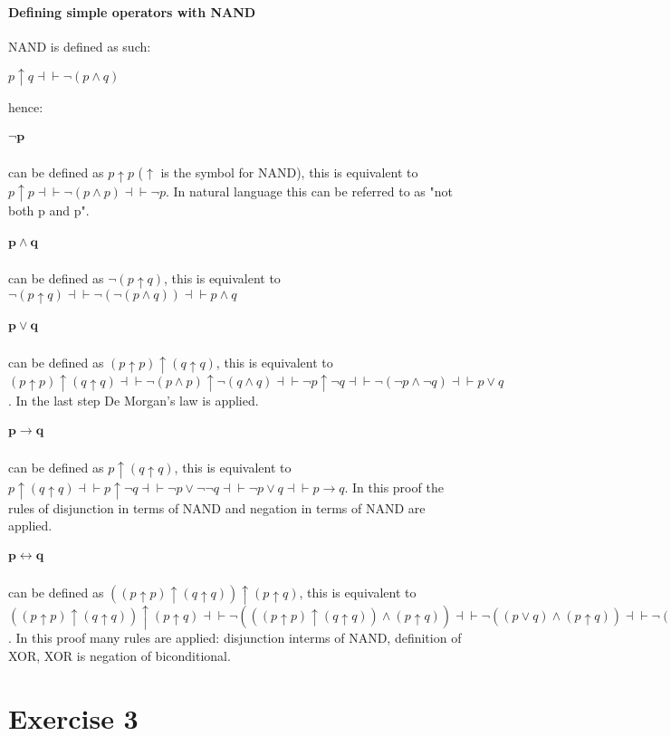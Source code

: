 \documentclass[11pt]{exam}
\begin{document}
\paragraph*{Defining simple operators with NAND} \hfill \break
NAND is defined as such:
\begin{center}
    \(p \uparrow q \dashv \vdash \neg(p \wedge q)\)
\end{center}
hence:
\subparagraph*{\(\bm{\neg p}\)}
can be defined as \(p \uparrow p\) (\(\uparrow\) is the symbol for NAND), this is equivalent to \(p \uparrow p \dashv \vdash \neg(p \wedge p) \dashv \vdash \neg p\). In natural language this can be referred to as "not both p and p".
\subparagraph*{\(\bm{p \wedge q}\)}
can be defined as \(\neg(p \uparrow q)\), this is equivalent to \(\neg(p \uparrow q) \dashv \vdash \neg(\neg(p \wedge q)) \dashv \vdash p \wedge q\)
\subparagraph*{\(\bm{p \vee q}\)}
can be defined as \((p \uparrow p) \uparrow (q \uparrow q)\), this is equivalent to \((p \uparrow p) \uparrow (q \uparrow q) \dashv \vdash \neg(p \wedge p) \uparrow \neg(q \wedge q) \dashv \vdash \neg p \uparrow \neg q \dashv \vdash \neg (\neg p \wedge \neg q) \dashv \vdash p \vee q\). In the last step De Morgan's law is applied.
\subparagraph*{\(\bm{p \rightarrow q}\)}
can be defined as \(p \uparrow (q \uparrow q)\), this is equivalent to \(p \uparrow (q \uparrow q) \dashv \vdash p \uparrow \neg q \dashv \vdash \neg p \vee \neg \neg q \dashv \vdash \neg p \vee q \dashv \vdash p \rightarrow q\). In this proof the rules of disjunction in terms of NAND and negation in terms of NAND are applied.
\subparagraph*{\(\bm{p \leftrightarrow q}\)}
can be defined as \(((p \uparrow p) \uparrow (q \uparrow q)) \uparrow (p \uparrow q)\), this is equivalent to \(((p \uparrow p) \uparrow (q \uparrow q)) \uparrow (p \uparrow q) \dashv \vdash \neg(((p \uparrow p) \uparrow (q \uparrow q)) \wedge (p \uparrow q)) \dashv \vdash \neg((p \vee q) \wedge (p \uparrow q)) \dashv \vdash \neg((p \vee q) \wedge \neg (p \wedge q)) \dashv \vdash \neg(p \oplus q) \dashv \vdash p \leftrightarrow q\). In this proof many rules are applied: disjunction interms of NAND, definition of XOR, XOR is negation of biconditional.
\section*{Exercise 3}
\end{document}
